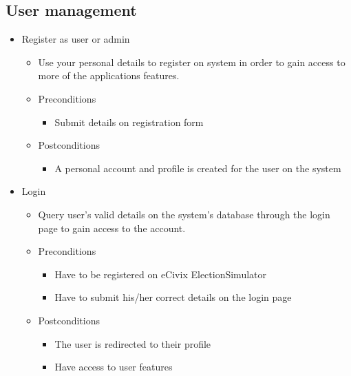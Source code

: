 \documentclass{article}
\begin{document}
   	\subsection{User management} 
    \begin{itemize}
    				\item Register as user or admin
				\begin{itemize}
					\item Use your personal details to register on system in order to gain access to more of the applications features.

					\item Preconditions
					\begin{itemize}
						\item Submit details on registration form
					\end{itemize}
					\item Postconditions
					\begin{itemize}
						\item A personal account and profile is created for the user on the system
					\end{itemize}
				\end{itemize}
				
				\item Login
				\begin{itemize}
					\item Query user’s valid details on the system’s database through the login page to gain access to the account. 
					\item Preconditions
					\begin{itemize}
						\item Have to be registered on eCivix ElectionSimulator
						\item Have to submit his/her correct details on the login page
					\end{itemize}
					\item Postconditions
					\begin{itemize}
						\item The user is redirected to their profile
						\item Have access to user features
					\end{itemize}
				\end{itemize}
				

\end{itemize}
\end{document}
